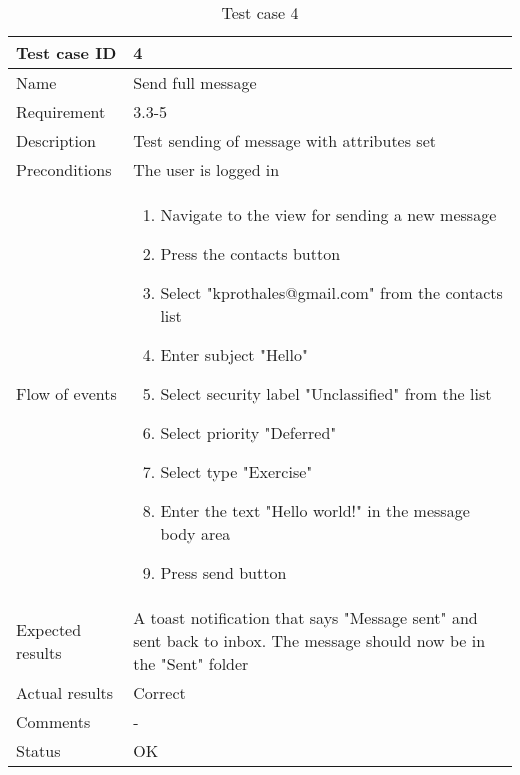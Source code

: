 		\begin{table}[htb]
			\begin{tabular}{l|p{10cm}}
				Test case ID & 4 \\ \hline
				Name & Send full message\\ \hline
				Requirement & 3.3-5\\ \hline
				Description & Test sending of message with attributes set\\ \hline
				Preconditions & The user is logged in\\ \hline
				Flow of events & 
					\begin{enumerate}
						\item{}Navigate to the view for sending a new message
						\item{}Press the contacts button
						\item{}Select "kprothales@gmail.com" from the contacts list
						\item{}Enter subject "Hello"
						\item{}Select security label "Unclassified" from the list
						\item{}Select priority "Deferred"
						\item{}Select type "Exercise"
						\item{}Enter the text "Hello world!" in the message body area
						\item{}Press send button
					\end{enumerate} \\ \hline
				Expected results & A toast notification that says "Message sent" and sent back to inbox. The message 							should now be in the "Sent" folder\\ \hline
				Actual results & Correct\\ \hline
				Comments &-\\ \hline
				Status &OK \\ \hline
			\end{tabular}
			\caption{Test case 4} \label{tab:case4}
		\end{table}

